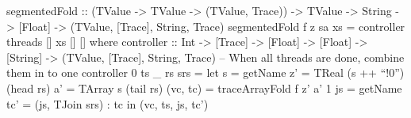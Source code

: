         \begin{haskell}[caption=Segmented fold, label=lst:segmented, gobble=12]
            segmentedFold :: (TValue -> TValue -> (TValue, Trace))
                -> TValue -> String -> [Float]
                -> (TValue, [Trace], String, Trace)
            segmentedFold f z sa xs =
                controller threads [] xs [] []
                where
                    controller :: Int -> [Trace] -> [Float] -> [Float]
                        -> [String] -> (TValue, [Trace], String, Trace)
                    -- When all threads are done, combine them in to one
                    controller 0 ts _   rs srs =
                        let s  = getName
                            z' = TReal (s ++ ``!0'') (head rs)
                            a' = TArray s (tail rs)
                            (vc, tc) = traceArrayFold f z' a' 1
                            js = getName
                            tc' = (js, TJoin srs) : tc
                        in  (vc, ts, js, tc')


\end{haskell}
